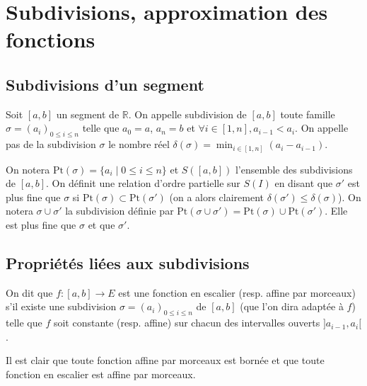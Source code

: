 \section{Subdivisions, approximation des fonctions}

\subsection{Subdivisions d'un segment}

\begin{de}
Soit $[a,b]$ un segment de $\mathbb{R}$. On appelle subdivision de $[a,b]$ toute famille $\sigma = (a_i)_{0 \leq i \leq n}$ telle que $a_0 = a$, $a_n = b$ et $\forall i \in [1,n], a_{i-1} < a_i$. On appelle pas de la subdivision $\sigma$ le nombre réel $\delta(\sigma) = \min_{i \in [1,n]}(a_i - a_{i-1})$.
\end{de}

On notera $\mathrm{Pt}(\sigma) = \{a_i \mid 0 \leq i \leq n\}$ et $S([a,b])$ l'ensemble des subdivisions de $[a,b]$. On définit une relation d'ordre partielle sur $S(I)$ en disant que $\sigma'$ est plus fine que $\sigma$ si $\mathrm{Pt}(\sigma) \subset \mathrm{Pt}(\sigma')$ (on a alors clairement $\delta(\sigma') \leq \delta(\sigma)$). On notera $\sigma \cup \sigma'$ la subdivision définie par $\mathrm{Pt}(\sigma \cup \sigma') = \mathrm{Pt}(\sigma) \cup \mathrm{Pt}(\sigma')$. Elle est plus fine que $\sigma$ et que $\sigma'$.

\subsection{Propriétés liées aux subdivisions}

\begin{de}
On dit que $f : [a,b] \to E$ est une fonction en escalier (resp. affine par morceaux) s'il existe une subdivision $\sigma = (a_i)_{0 \leq i \leq n}$ de $[a,b]$ (que l'on dira adaptée à $f$) telle que $f$ soit constante (resp. affine) sur chacun des intervalles ouverts $]a_{i-1},a_i[$.
\end{de}

\begin{rem}
Il est clair que toute fonction affine par morceaux est bornée et que toute fonction en escalier est affine par morceaux.
\end{rem}

